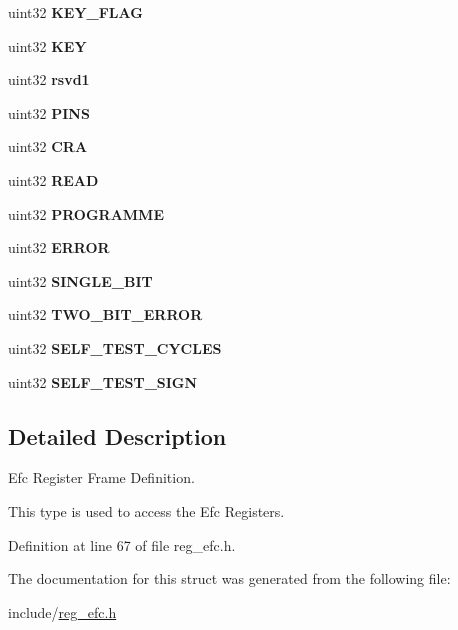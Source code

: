 \begin{DoxyCompactItemize}
uint32 {\bfseries K\+E\+Y\+\_\+\+F\+L\+AG}
\item 
\mbox{\label{structefcBase_a993e739d8e5d49614ee5549b99bcdf14}} 
uint32 {\bfseries K\+EY}
\item 
\mbox{\label{structefcBase_a9e69353d8c3f047fe62f3d09bea494e9}} 
uint32 {\bfseries rsvd1}
\item 
\mbox{\label{structefcBase_a41af142aba37fd019efab1eb2a8faec8}} 
uint32 {\bfseries P\+I\+NS}
\item 
\mbox{\label{structefcBase_aa08b572b0b6513ec343c3557e7fb4d14}} 
uint32 {\bfseries C\+RA}
\item 
\mbox{\label{structefcBase_adfbc994e163959c8657ed10a942ca924}} 
uint32 {\bfseries R\+E\+AD}
\item 
\mbox{\label{structefcBase_a28d4f39a8d880331b541d54905f53402}} 
uint32 {\bfseries P\+R\+O\+G\+R\+A\+M\+ME}
\item 
\mbox{\label{structefcBase_ac35bc0707b988a82ecc1f4a10e71f4fc}} 
uint32 {\bfseries E\+R\+R\+OR}
\item 
\mbox{\label{structefcBase_ae701654b0dd9e6f579e3d38cead2eddd}} 
uint32 {\bfseries S\+I\+N\+G\+L\+E\+\_\+\+B\+IT}
\item 
\mbox{\label{structefcBase_a41e107b6df57e09a4b4622b175c47e7e}} 
uint32 {\bfseries T\+W\+O\+\_\+\+B\+I\+T\+\_\+\+E\+R\+R\+OR}
\item 
\mbox{\label{structefcBase_a79b5a3e9c8b9d1640d0b8bdc1d3a966d}} 
uint32 {\bfseries S\+E\+L\+F\+\_\+\+T\+E\+S\+T\+\_\+\+C\+Y\+C\+L\+ES}
\item 
\mbox{\label{structefcBase_a1650cccafa3e79df8cf0bd3bbf6fb555}} 
uint32 {\bfseries S\+E\+L\+F\+\_\+\+T\+E\+S\+T\+\_\+\+S\+I\+GN}
\end{DoxyCompactItemize}


\subsection{Detailed Description}
Efc Register Frame Definition. 

This type is used to access the Efc Registers. 

Definition at line 67 of file reg\+\_\+efc.\+h.



The documentation for this struct was generated from the following file\+:\begin{DoxyCompactItemize}
\item 
include/\mbox{\hyperlink{reg__efc_8h}{reg\+\_\+efc.\+h}}\end{DoxyCompactItemize}
